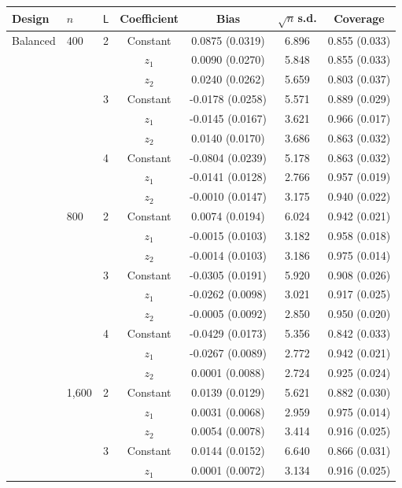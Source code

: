\begin{tabular}{llccccc}
\toprule
Design & $n$ & $\mathsf L$ & Coefficient & Bias & $\sqrt{n}\,$s.d. & Coverage \\
\midrule
Balanced & 400 & 2 & Constant & 0.0875 (0.0319) & 6.896 & 0.855 (0.033) \\
 &  &  & $z_1$ & 0.0090 (0.0270) & 5.848 & 0.855 (0.033) \\
 &  &  & $z_2$ & 0.0240 (0.0262) & 5.659 & 0.803 (0.037) \\
\addlinespace
 &  & 3 & Constant & -0.0178 (0.0258) & 5.571 & 0.889 (0.029) \\
 &  &  & $z_1$ & -0.0145 (0.0167) & 3.621 & 0.966 (0.017) \\
 &  &  & $z_2$ & 0.0140 (0.0170) & 3.686 & 0.863 (0.032) \\
\addlinespace
 &  & 4 & Constant & -0.0804 (0.0239) & 5.178 & 0.863 (0.032) \\
 &  &  & $z_1$ & -0.0141 (0.0128) & 2.766 & 0.957 (0.019) \\
 &  &  & $z_2$ & -0.0010 (0.0147) & 3.175 & 0.940 (0.022) \\
\addlinespace
 & 800 & 2 & Constant & 0.0074 (0.0194) & 6.024 & 0.942 (0.021) \\
 &  &  & $z_1$ & -0.0015 (0.0103) & 3.182 & 0.958 (0.018) \\
 &  &  & $z_2$ & -0.0014 (0.0103) & 3.186 & 0.975 (0.014) \\
\addlinespace
 &  & 3 & Constant & -0.0305 (0.0191) & 5.920 & 0.908 (0.026) \\
 &  &  & $z_1$ & -0.0262 (0.0098) & 3.021 & 0.917 (0.025) \\
 &  &  & $z_2$ & -0.0005 (0.0092) & 2.850 & 0.950 (0.020) \\
\addlinespace
 &  & 4 & Constant & -0.0429 (0.0173) & 5.356 & 0.842 (0.033) \\
 &  &  & $z_1$ & -0.0267 (0.0089) & 2.772 & 0.942 (0.021) \\
 &  &  & $z_2$ & 0.0001 (0.0088) & 2.724 & 0.925 (0.024) \\
\addlinespace
 & 1,600 & 2 & Constant & 0.0139 (0.0129) & 5.621 & 0.882 (0.030) \\
 &  &  & $z_1$ & 0.0031 (0.0068) & 2.959 & 0.975 (0.014) \\
 &  &  & $z_2$ & 0.0054 (0.0078) & 3.414 & 0.916 (0.025) \\
\addlinespace
 &  & 3 & Constant & 0.0144 (0.0152) & 6.640 & 0.866 (0.031) \\
 &  &  & $z_1$ & 0.0001 (0.0072) & 3.134 & 0.916 (0.025) \\

\end{tabular}

